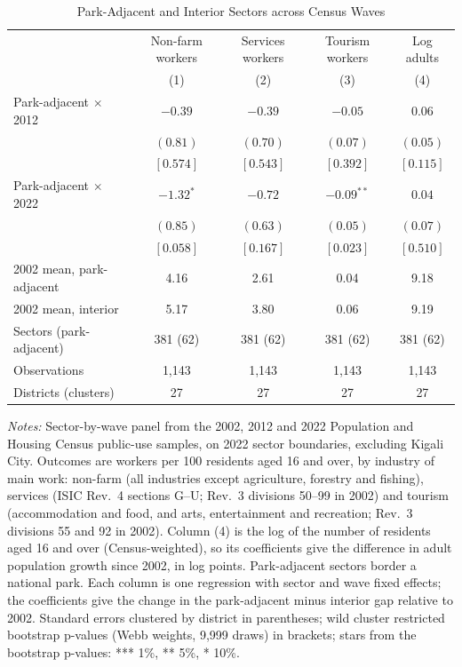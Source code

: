\documentclass[11pt]{article}
\begin{document}
\begin{table}[H]
\centering
\caption{Park-Adjacent and Interior Sectors across Census Waves}
\label{tab:census_park_gap}
\begin{tabular}{lcccc}
\toprule
 & Non-farm workers & Services workers & Tourism workers & Log adults \\
 & (1) & (2) & (3) & (4) \\
\midrule
Park-adjacent $\times$ 2012 & $-0.39$ & $-0.39$ & $-0.05$ & $0.06$ \\
 & $(0.81)$ & $(0.70)$ & $(0.07)$ & $(0.05)$ \\
 & $[0.574]$ & $[0.543]$ & $[0.392]$ & $[0.115]$ \\
Park-adjacent $\times$ 2022 & $-1.32^{*}$ & $-0.72$ & $-0.09^{**}$ & $0.04$ \\
 & $(0.85)$ & $(0.63)$ & $(0.05)$ & $(0.07)$ \\
 & $[0.058]$ & $[0.167]$ & $[0.023]$ & $[0.510]$ \\
\midrule
2002 mean, park-adjacent & 4.16 & 2.61 & 0.04 & 9.18 \\
2002 mean, interior & 5.17 & 3.80 & 0.06 & 9.19 \\
Sectors (park-adjacent) & 381 (62) & 381 (62) & 381 (62) & 381 (62) \\
Observations & 1,143 & 1,143 & 1,143 & 1,143 \\
Districts (clusters) & 27 & 27 & 27 & 27 \\
\bottomrule
\end{tabular}
\begin{minipage}{0.95\textwidth}\footnotesize
\textit{Notes:} Sector-by-wave panel from the 2002, 2012 and 2022 Population and Housing Census public-use samples, on 2022 sector boundaries, excluding Kigali City. Outcomes are workers per 100 residents aged 16 and over, by industry of main work: non-farm (all industries except agriculture, forestry and fishing), services (ISIC Rev.~4 sections G--U; Rev.~3 divisions 50--99 in 2002) and tourism (accommodation and food, and arts, entertainment and recreation; Rev.~3 divisions 55 and 92 in 2002). Column (4) is the log of the number of residents aged 16 and over (Census-weighted), so its coefficients give the difference in adult population growth since 2002, in log points. Park-adjacent sectors border a national park. Each column is one regression with sector and wave fixed effects; the coefficients give the change in the park-adjacent minus interior gap relative to 2002. Standard errors clustered by district in parentheses; wild cluster restricted bootstrap p-values (Webb weights, 9,999 draws) in brackets; stars from the bootstrap p-values: *** 1\%, ** 5\%, * 10\%.
\end{minipage}
\end{table}
\end{document}
